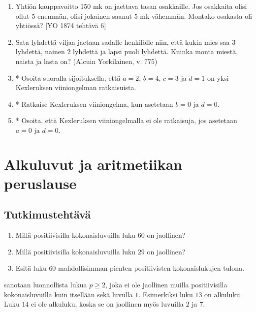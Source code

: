 \begin{enumerate}
\item Yhtiön kauppavoitto 150 mk on jaettava tasan osakkaille. Jos osakkaita olisi ollut 5 enemmän, olisi jokainen saanut 5 mk vähemmän. Montako osakasta oli yhtiössä? 
[YO 1874 tehtävä 6]

\item Sata lyhdettä viljaa jaetaan sadalle henkilölle niin, että kukin mies saa $3$ lyhdettä, nainen $2$ lyhdettä ja lapsi puoli lyhdettä. Kuinka monta miestä, naista ja lasta on? (Alcuin Yorkilainen, v. 775)

\item * %
Osoita suoralla sijoituksella, että $a=2$, $b=4$, $c=3$ ja $d=1$ on yksi Kexleruksen viiniongelman ratkaisuista.

\item * %
Ratkaise Kexleruksen viiniongelma, kun asetetaan $b=0$ ja $d=0$.

\item * %
Osoita, että Kexleruksen viiniongelmalla ei ole ratkaisuja, jos asetetaan $a=0$ ja $d=0$.

\end{enumerate}


\newpage


\section{Alkuluvut ja aritmetiikan peruslause}

\subsection*{Tutkimustehtävä}
\begin{enumerate}
\item Millä positiivisilla kokonaisluvuilla luku $60$ on jaollinen?
\item Millä positiivisilla kokonaisluvuilla luku $29$ on jaollinen?
\item Esitä luku $60$ mahdollisimman pienten positiivisten kokonaislukujen tulona.
\end{enumerate}

 sanotaan luonnollista lukua $p\ge 2$, joka ei ole jaollinen muilla positiivisilla kokonaisluvuilla kuin itsellään sekä luvulla $1$. Esimerkiksi luku $13$ on alkuluku. Luku $14$ ei ole alkuluku, koska se on jaollinen myös luvuilla $2$ ja $7$.

